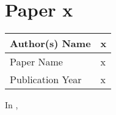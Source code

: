 \section{Paper x}
    \begin{center}
    \begin{tabular}{ | m{5em} | m{25em} |} 
      \hline
      Author(s) Name &  x\\ 
      \hline
      Paper Name &  x\\ 
      \hline
      Publication Year &  x\\ 
      \hline
    \end{tabular}
    \end{center}
    In \cite{}, 